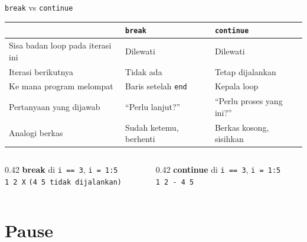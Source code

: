 \documentclass[aspectratio=169,10pt]{beamer}
\newcommand{\kode}[1]{\texttt{#1}}
\begin{document}
\begin{frame}[fragile]{\kode{break} vs \kode{continue}}
  \centering
  \begin{tabular}{@{}lll@{}}
    \toprule
    & \kode{break} & \kode{continue} \\
    \midrule
    Sisa badan loop pada iterasi ini & Dilewati & Dilewati \\
    Iterasi berikutnya & \alert{Tidak ada} & Tetap dijalankan \\
    Ke mana program melompat & Baris setelah \kode{end} & Kepala loop \\
    Pertanyaan yang dijawab & ``Perlu lanjut?'' & ``Perlu proses yang ini?'' \\
    Analogi berkas & Sudah ketemu, berhenti & Berkas kosong, sisihkan \\
    \bottomrule
  \end{tabular}

  \vspace{12pt}
  \begin{columns}[T]
    \begin{column}{0.42\textwidth}
      \centering
      \textbf{break} di \kode{i == 3}, \kode{i = 1:5}\\[2pt]
      \texttt{1 2 \alert{X}} \textcolor{black!40}{\texttt{(4 5 tidak dijalankan)}}
    \end{column}
    \begin{column}{0.42\textwidth}
      \centering
      \textbf{continue} di \kode{i == 3}, \kode{i = 1:5}\\[2pt]
      \texttt{1 2 \alert{-} 4 5}
    \end{column}
  \end{columns}
\end{frame}

\section{Pause}
\end{document}
